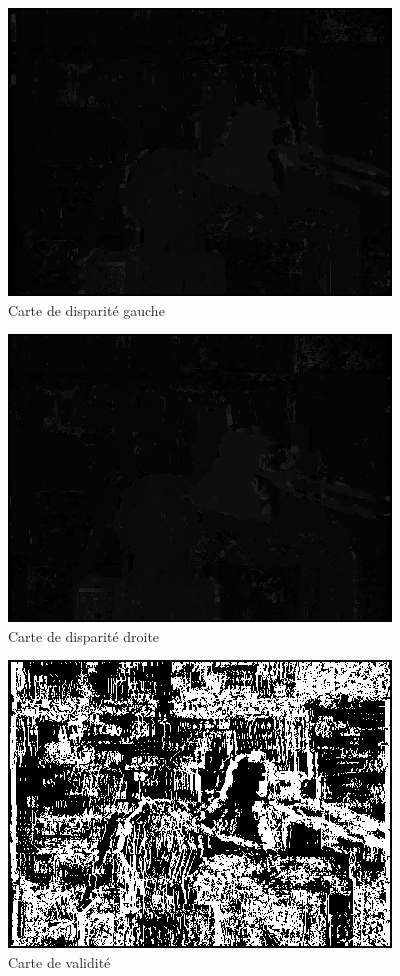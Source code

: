 \documentclass[a4paper]{article}
\begin{document}
\begin{figure}[h]
\begin{center}
	\includegraphics{left-disparity.png}
\end{center}
\caption{Carte de disparité gauche}
\end{figure}

\begin{figure}[h]
\begin{center}
	\includegraphics{right-disparity.png}
\end{center}
\caption{Carte de disparité droite}
\end{figure}

\begin{figure}[h]
\begin{center}
	\includegraphics{validity-mask.png}
\end{center}
\caption{Carte de validité}
\end{figure}
\end{document}
